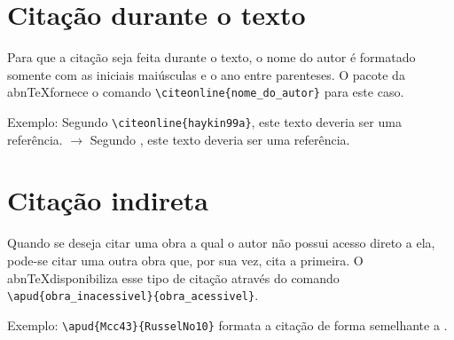 \documentclass{fei}
\begin{document}
    \section{Citação durante o texto}
    Para que a citação seja feita durante o texto, o nome do autor é formatado somente com as iniciais maiúsculas e o ano entre parenteses. O pacote da abn\TeX fornece o comando \verb+\citeonline{nome_do_autor}+ para este caso.

    Exemplo: Segundo \verb+\citeonline{haykin99a}+, este texto deveria ser uma referência. $\to$ Segundo , este texto deveria ser uma referência.
	
	\section{Citação indireta}
	Quando se deseja citar uma obra a qual o autor não possui acesso direto a ela, pode-se citar uma outra obra que, por sua vez, cita a primeira. O abn\TeX disponibiliza esse tipo de citação através do comando \verb+\apud{obra_inacessivel}{obra_acessivel}+.
	
	Exemplo: \verb++ formata a citação de forma semelhante a \apud{Mcc43}{RusselNo10}.

\end{document}
